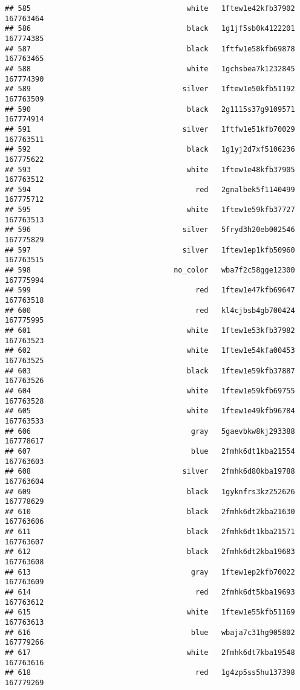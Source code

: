 \documentclass[
]{article}
\begin{document}
\begin{verbatim}
## 585                                    white   1ftew1e42kfb37902 167763464
## 586                                    black   1g1jf5sb0k4122201 167774385
## 587                                    black   1ftfw1e58kfb69878 167763465
## 588                                    white   1gchsbea7k1232845 167774390
## 589                                   silver   1ftew1e50kfb51192 167763509
## 590                                    black   2g1115s37g9109571 167774914
## 591                                   silver   1ftfw1e51kfb70029 167763511
## 592                                    black   1g1yj2d7xf5106236 167775622
## 593                                    white   1ftew1e48kfb37905 167763512
## 594                                      red   2gnalbek5f1140499 167775712
## 595                                    white   1ftew1e59kfb37727 167763513
## 596                                   silver   5fryd3h20eb002546 167775829
## 597                                   silver   1ftew1ep1kfb50960 167763515
## 598                                 no_color   wba7f2c58gge12300 167775994
## 599                                      red   1ftew1e47kfb69647 167763518
## 600                                      red   kl4cjbsb4gb700424 167775995
## 601                                    white   1ftew1e53kfb37982 167763523
## 602                                    white   1ftew1e54kfa00453 167763525
## 603                                    black   1ftew1e59kfb37887 167763526
## 604                                    white   1ftew1e59kfb69755 167763528
## 605                                    white   1ftew1e49kfb96784 167763533
## 606                                     gray   5gaevbkw8kj293388 167778617
## 607                                     blue   2fmhk6dt1kba21554 167763603
## 608                                   silver   2fmhk6d80kba19788 167763604
## 609                                    black   1gyknfrs3kz252626 167778629
## 610                                    black   2fmhk6dt2kba21630 167763606
## 611                                    black   2fmhk6dt1kba21571 167763607
## 612                                    black   2fmhk6dt2kba19683 167763608
## 613                                     gray   1ftew1ep2kfb70022 167763609
## 614                                      red   2fmhk6dt5kba19693 167763612
## 615                                    white   1ftew1e55kfb51169 167763613
## 616                                     blue   wbaja7c31hg905802 167779266
## 617                                    white   2fmhk6dt7kba19548 167763616
## 618                                      red   1g4zp5ss5hu137398 167779269

\end{verbatim}
\end{document}
